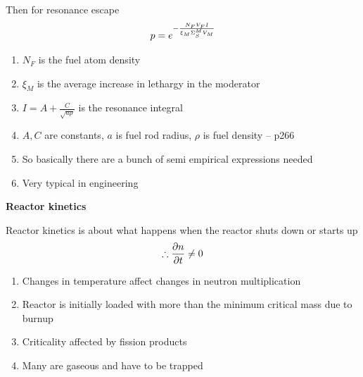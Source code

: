 \documentclass[aspectratio=1610,pdftex,dvipsnames,compress,xcolor={dvipsnames}]{beamer}
\begin{document}
\begin{frame}{Then for resonance escape}
    \begin{equation}
        \LARGE
        p = e^{-\frac{N_F V_F I}{\xi_M \Sigma_S^M V_M}}
    \end{equation}

    \vspace*{\fill}

    \begin{enumerate}[series=outerlist,topsep=0pt,itemsep=21pt,leftmargin=*,label=(\arabic*)]
        \item[]$N_F$ is the fuel atom density
        \item[]$\xi_M$ is the average increase in lethargy in the moderator
        \item[]$I = A + \frac{C}{\sqrt{a\rho}}$ is the resonance integral
        \item[]$A,C$ are constants, $a$ is fuel rod radius, $\rho$ is fuel density -- p266
        \item[]So basically there are a bunch of semi empirical expressions needed
        \item[]Very typical in engineering
    \end{enumerate}
\end{frame}


\begin{frame}[plain]{}
    \centering\LARGE\textbf{Reactor kinetics}
\end{frame}


\addtocounter{framenumber}{-1} 
\begin{frame}{Reactor kinetics is about what happens when the reactor shuts down or starts up}
    \begin{equation}
        \LARGE
        \therefore \frac{\partial{n}}{\partial{t}} \neq 0
    \end{equation}

    \vspace*{\fill}

    \begin{enumerate}[series=outerlist,topsep=0pt,itemsep=21pt,leftmargin=*,label=(\arabic*)]
        \item[]Changes in temperature affect changes in neutron multiplication
        \item[]Reactor is initially loaded with more than the minimum critical mass due to burnup
        \item[]Criticality affected by fission products
        \item[]Many are gaseous and have to be trapped
    \end{enumerate}
\end{frame}
\end{document}
